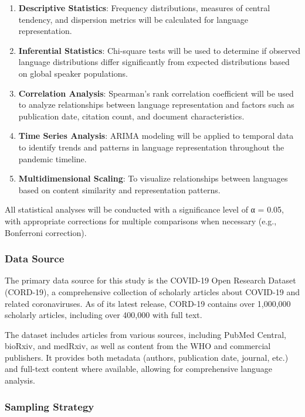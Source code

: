 \documentclass[
]{article}
\begin{document}
\begin{enumerate}
\def\labelenumi{\arabic{enumi}.}
\item
  \textbf{Descriptive Statistics}: Frequency distributions, measures of
  central tendency, and dispersion metrics will be calculated for
  language representation.
\item
  \textbf{Inferential Statistics}: Chi-square tests will be used to
  determine if observed language distributions differ significantly from
  expected distributions based on global speaker populations.
\item
  \textbf{Correlation Analysis}: Spearman's rank correlation coefficient
  will be used to analyze relationships between language representation
  and factors such as publication date, citation count, and document
  characteristics.
\item
  \textbf{Time Series Analysis}: ARIMA modeling will be applied to
  temporal data to identify trends and patterns in language
  representation throughout the pandemic timeline.
\item
  \textbf{Multidimensional Scaling}: To visualize relationships between
  languages based on content similarity and representation patterns.
\end{enumerate}

All statistical analyses will be conducted with a significance level of
α = 0.05, with appropriate corrections for multiple comparisons when
necessary (e.g., Bonferroni correction).

\subsubsection{Data Source}\label{data-source}

The primary data source for this study is the COVID-19 Open Research
Dataset (CORD-19), a comprehensive collection of scholarly articles
about COVID-19 and related coronaviruses. As of its latest release,
CORD-19 contains over 1,000,000 scholarly articles, including over
400,000 with full text.

The dataset includes articles from various sources, including PubMed
Central, bioRxiv, and medRxiv, as well as content from the WHO and
commercial publishers. It provides both metadata (authors, publication
date, journal, etc.) and full-text content where available, allowing for
comprehensive language analysis.

\subsubsection{Sampling Strategy}\label{sampling-strategy}
\end{document}
